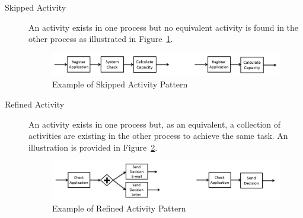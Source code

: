\begin{description}
  \item[Skipped Activity] An activity exists in one process but no equivalent activity is found in the other process as illustrated in Figure~\ref{fig:skipped-activity}.
      \begin{figure}
      \centering
      \includegraphics[width=\textwidth]{3_background/mismatch-patterns-skipped-activity}
      \caption{Example of Skipped Activity Pattern}
      \label{fig:skipped-activity}
      \end{figure}
  \item[Refined Activity] An activity exists in one process but, as an equivalent, a collection of activities are existing in the other process to achieve the same task. An illustration is provided in Figure~\ref{fig:refined-activity}. 
      \begin{figure}
      \centering
      \includegraphics[width=\textwidth]{3_background/mismatch-patterns-refined-activity}
      \caption{Example of Refined Activity Pattern}
      \label{fig:refined-activity}
      \end{figure}
\end{description}
 
